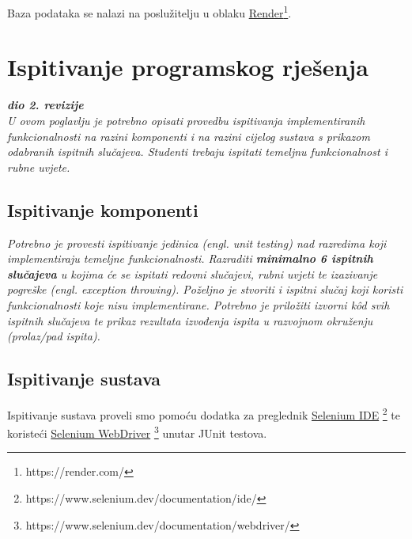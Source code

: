 Baza podataka se nalazi na poslužitelju u oblaku \underline{Render}\footnote{https://render.com/}.

\eject


\section{Ispitivanje programskog rješenja}

\textbf{\textit{dio 2. revizije}}\\

\textit{U ovom poglavlju je potrebno opisati provedbu ispitivanja implementiranih funkcionalnosti na razini komponenti i na razini cijelog sustava s prikazom odabranih ispitnih slučajeva. Studenti trebaju ispitati temeljnu funkcionalnost i rubne uvjete.}

\subsection{Ispitivanje komponenti}
\textit{Potrebno je provesti ispitivanje jedinica (engl. unit testing) nad razredima koji implementiraju temeljne funkcionalnosti. Razraditi \textbf{minimalno 6 ispitnih slučajeva} u kojima će se ispitati redovni slučajevi, rubni uvjeti te izazivanje pogreške (engl. exception throwing). Poželjno je stvoriti i ispitni slučaj koji koristi funkcionalnosti koje nisu implementirane. Potrebno je priložiti izvorni kôd svih ispitnih slučajeva te prikaz rezultata izvođenja ispita u razvojnom okruženju (prolaz/pad ispita). }

\subsection{Ispitivanje sustava}

Ispitivanje sustava proveli smo pomoću dodatka za preglednik
\underline{Selenium IDE} \footnote{https://www.selenium.dev/documentation/ide/}
te koristeći \underline{Selenium WebDriver}
\footnote{https://www.selenium.dev/documentation/webdriver/} unutar JUnit
testova.

